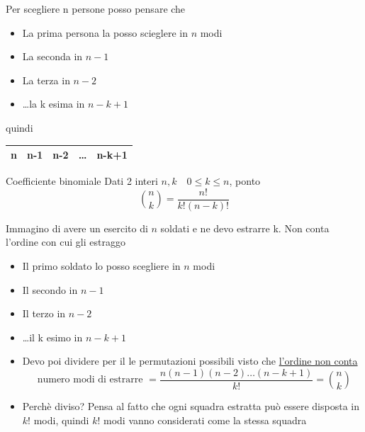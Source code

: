 Per scegliere n persone posso pensare che
\begin{itemize}
	\item La prima persona la posso scieglere in $n$ modi
	\item La seconda in $n-1$
	\item La terza in $n-2$
	\item \ldots la k esima in $n-k+1$
\end{itemize}
quindi
\begin{table}[H]
	\centering
	\begin{tabular}{|c|c|c|c|c|}
		\hline
		n & n-1 & n-2 & \ldots & n-k+1 \\
		\hline
	\end{tabular}
\end{table}

\begin{definizione}{Coefficiente binomiale
	}
	Dati 2 interi $n,k \quad 0 \le k\le n$, ponto \[
		\binom{n}{k}= \frac{n!}{k! \left( n-k \right) !}
	\]

\end{definizione}
Immagino di avere un esercito di $n$ soldati e ne devo estrarre k. Non conta l'ordine con cui gli estraggo
\begin{itemize}
	\item Il primo soldato lo posso scegliere in $n$ modi
	\item Il secondo in $n-1$
	\item Il terzo in $n-2$
	\item \ldots il k esimo in $n-k+1$
	\item Devo poi dividere per il le permutazioni possibili visto che \underline{l'ordine non conta}
	      \[
		      \text{ numero modi di estrarre } = \frac{n\left( n-1 \right) \left( n-2 \right) \ldots \left( n-k+1 \right)}{k!} = \binom{n}{k}
	      \]
	\item Perchè diviso? Pensa al fatto che ogni squadra estratta può essere disposta in $k!$ modi, quindi $k!$ modi vanno considerati come la stessa squadra
\end{itemize}

